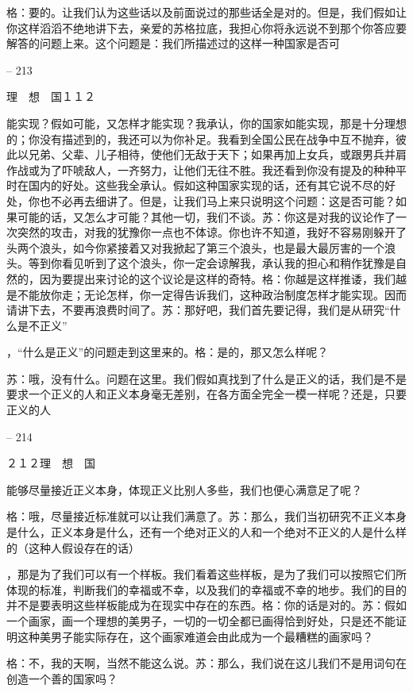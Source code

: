 \documentclass[11pt,oneside]{book}
\begin{document}
\begin{common-format}
    格：要的。让我们认为这些话以及前面说过的那些话全是对的。但是，我们假如让你这样滔滔不绝地讲下去，亲爱的苏格拉底，我担心你将永远说不到那个你答应要解答的问题上来。这个问题是：我们所描述过的这样一种国家是否可

    

-- 213

    理　想　国１１２

    能实现？假如可能，又怎样才能实现？我承认，你的国家如能实现，那是十分理想的；你没有描述到的，我还可以为你补足。我看到全国公民在战争中互不抛弃，彼此以兄弟、父辈、儿子相待，使他们无敌于天下；如果再加上女兵，或跟男兵并肩作战或为了吓唬敌人，一齐努力，让他们无往不胜。我还看到你没有提及的种种平时在国内的好处。这些我全承认。假如这种国家实现的话，还有其它说不尽的好处，你也不必再去细讲了。但是，让我们马上来只说明这个问题：这是否可能？如果可能的话，又怎么才可能？其他一切，我们不谈。苏：你这是对我的议论作了一次突然的攻击，对我的犹豫你一点也不体谅。你也许不知道，我好不容易刚躲开了头两个浪头，如今你紧接着又对我掀起了第三个浪头，也是最大最厉害的一个浪头。等到你看见听到了这个浪头，你一定会谅解我，承认我的担心和稍作犹豫是自然的，因为要提出来讨论的这个议论是这样的奇特。格：你越是这样推诿，我们越是不能放你走；无论怎样，你一定得告诉我们，这种政治制度怎样才能实现。因而请讲下去，不要再浪费时间了。苏：那好吧，我们首先要记得，我们是从研究“什么是不正义”

    ，“什么是正义”的问题走到这里来的。格：是的，那又怎么样呢？

    苏：哦，没有什么。问题在这里。我们假如真找到了什么是正义的话，我们是不是要求一个正义的人和正义本身毫无差别，在各方面全完全一模一样呢？还是，只要正义的人

    

-- 214

    ２１２理　想　国

    能够尽量接近正义本身，体现正义比别人多些，我们也便心满意足了呢？

    格：哦，尽量接近标准就可以让我们满意了。苏：那么，我们当初研究不正义本身是什么，正义本身是什么，还有一个绝对正义的人和一个绝对不正义的人是什么样的（这种人假设存在的话）

    ，那是为了我们可以有一个样板。我们看着这些样板，是为了我们可以按照它们所体现的标准，判断我们的幸福或不幸，以及我们的幸福或不幸的地步。我们的目的并不是要表明这些样板能成为在现实中存在的东西。格：你的话是对的。苏：假如一个画家，画一个理想的美男子，一切的一切全都已画得恰到好处，只是还不能证明这种美男子能实际存在，这个画家难道会由此成为一个最糟糕的画家吗？

    格：不，我的天啊，当然不能这么说。苏：那么，我们说在这儿我们不是用词句在创造一个善的国家吗？


\end{common-format}
\end{document}
